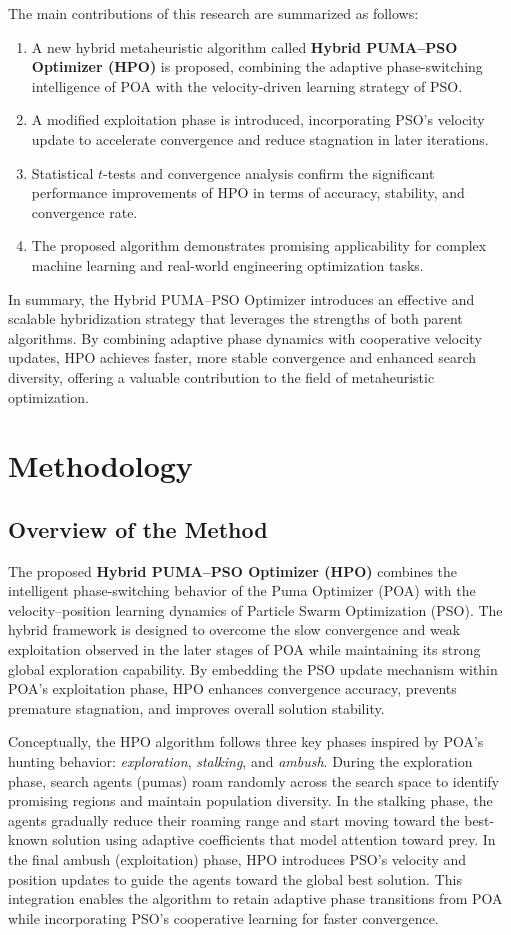 \documentclass[a4paper,12pt]{article}
\begin{document}
The main contributions of this research are summarized as follows:
\begin{enumerate}[label=(\Roman*)]
    \item A new hybrid metaheuristic algorithm called \textbf{Hybrid PUMA--PSO Optimizer (HPO)} is proposed, combining the adaptive phase-switching intelligence of POA with the velocity-driven learning strategy of PSO.
    \item A modified exploitation phase is introduced, incorporating PSO’s velocity update to accelerate convergence and reduce stagnation in later iterations.
    \item Statistical $t$-tests and convergence analysis confirm the significant performance improvements of HPO in terms of accuracy, stability, and convergence rate.
    \item The proposed algorithm demonstrates promising applicability for complex machine learning and real-world engineering optimization tasks.
\end{enumerate}

In summary, the Hybrid PUMA--PSO Optimizer introduces an effective and scalable hybridization strategy that leverages the strengths of both parent algorithms. By combining adaptive phase dynamics with cooperative velocity updates, HPO achieves faster, more stable convergence and enhanced search diversity, offering a valuable contribution to the field of metaheuristic optimization.

\section{Methodology}
\subsection{Overview of the Method}

The proposed \textbf{Hybrid PUMA--PSO Optimizer (HPO)} combines the intelligent phase-switching behavior of the Puma Optimizer (POA) with the velocity--position learning dynamics of Particle Swarm Optimization (PSO). The hybrid framework is designed to overcome the slow convergence and weak exploitation observed in the later stages of POA while maintaining its strong global exploration capability. By embedding the PSO update mechanism within POA’s exploitation phase, HPO enhances convergence accuracy, prevents premature stagnation, and improves overall solution stability.

Conceptually, the HPO algorithm follows three key phases inspired by POA’s hunting behavior: \textit{exploration}, \textit{stalking}, and \textit{ambush}. During the exploration phase, search agents (pumas) roam randomly across the search space to identify promising regions and maintain population diversity. In the stalking phase, the agents gradually reduce their roaming range and start moving toward the best-known solution using adaptive coefficients that model attention toward prey. In the final ambush (exploitation) phase, HPO introduces PSO’s velocity and position updates to guide the agents toward the global best solution. This integration enables the algorithm to retain adaptive phase transitions from POA while incorporating PSO’s cooperative learning for faster convergence.
\end{document}
